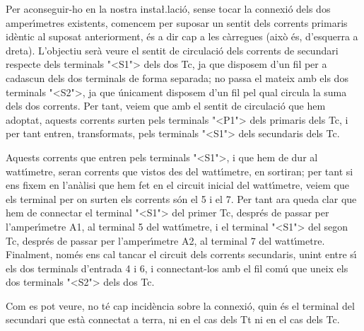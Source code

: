 \begin{exemple}
    Per aconseguir-ho en la nostra insta{\l.l}aci\'{o}, sense tocar la
    connexi\'{o} dels dos amper\'{\i}metres existents, comencem per suposar un
    sentit dels corrents primaris id\`{e}ntic al suposat anteriorment, \'{e}s a
    dir cap a les c\`{a}rregues (aix\`{o} \'{e}s, d'esquerra a dreta). L'objectiu
    ser\`{a} veure el sentit de circulaci\'{o} dels corrents de secundari
    respecte dels terminals {"<}\textsf{S1}{">} dels dos Tc, ja que disposem d'un fil per
    a cadascun dels dos terminals de forma separada; no passa el mateix
    amb els dos terminals {"<}\textsf{S2}{">}, ja que \'{u}nicament disposem d'un fil pel
    qual circula la suma dels dos corrents. Per tant, veiem que amb el
    sentit de circulaci\'{o} que hem adoptat, aquests corrents surten pels
    terminals {"<}\textsf{P1}{">} dels primaris dels Tc, i per tant entren, transformats,
    pels terminals {"<}\textsf{S1}{">} dels secundaris dels Tc.

    Aquests corrents que entren pels terminals {"<}\textsf{S1}{">}, i que hem de dur al
    watt\'{\i}metre, seran corrents que vistos des del watt\'{\i}metre, en
    sortiran; per tant si ens fixem en l'an\`{a}lisi que hem fet en el
    circuit inicial del watt\'{\i}metre, veiem que els terminal per on surten
    els corrents s\'{o}n el 5 i el 7. Per tant ara queda clar que hem de
    connectar el terminal {"<}\textsf{S1}{">} del primer Tc, despr\'{e}s de passar per
    l'amper\'{\i}metre \textsf{A1}, al terminal 5 del watt\'{\i}metre, i el
    terminal {"<}\textsf{S1}{">} del segon Tc, despr\'{e}s de passar per l'amper\'{\i}metre
    \textsf{A2}, al terminal 7 del watt\'{\i}metre. Finalment, nom\'{e}s ens cal
    tancar el circuit dels corrents secundaris, unint entre s\'{\i} els dos
    terminals d'entrada 4  i 6, i connectant-los amb el fil com\'{u} que
    uneix els dos terminals {"<}\textsf{S2}{">} dels dos Tc.

    Com es pot veure, no t\'{e} cap incid\`{e}ncia sobre la connexi\'{o}, quin \'{e}s
    el terminal del secundari que est\`{a} connectat a terra, ni en el cas
    dels Tt ni en el cas dels Tc.
\end{exemple}
